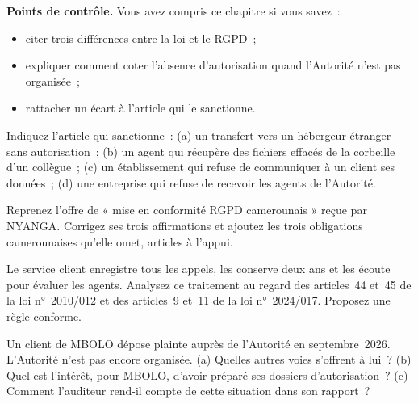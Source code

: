 \begin{boxinfo}
\textbf{Points de contrôle.} Vous avez compris ce chapitre si vous savez~:
\begin{itemize}
    \item citer trois différences entre la loi et le RGPD~;
    \item expliquer comment coter l'absence d'autorisation quand l'Autorité
          n'est pas organisée~;
    \item rattacher un écart à l'article qui le sanctionne.
\end{itemize}
\end{boxinfo}

\begin{boxexo}[title={\ding{45}\quad Exercice~8.1. Quel article \niveaubase}]
Indiquez l'article qui sanctionne~: (a) un transfert vers un hébergeur
étranger sans autorisation~; (b) un agent qui récupère des fichiers
effacés de la corbeille d'un collègue~; (c) un établissement qui refuse de
communiquer à un client ses données~; (d) une entreprise qui refuse de
recevoir les agents de l'Autorité.
\end{boxexo}

\begin{boxexo}[title={\ding{45}\quad Exercice~8.2. L'offre du cabinet \niveaumoyen}]
Reprenez l'offre de « mise en conformité RGPD camerounais » reçue par
NYANGA. Corrigez ses trois affirmations et ajoutez les trois obligations
camerounaises qu'elle omet, articles à l'appui.
\end{boxexo}

\begin{boxexo}[title={\ding{45}\quad Exercice~8.3. Les appels enregistrés \niveaumoyen}]
Le service client enregistre tous les appels, les conserve deux ans et les
écoute pour évaluer les agents. Analysez ce traitement au regard des
articles~44 et~45 de la loi n°~2010/012 et des articles~9 et~11 de la loi
n°~2024/017. Proposez une règle conforme.
\end{boxexo}

\begin{boxexo}[title={\ding{45}\quad Exercice~8.4. Sans Autorité \niveauexpert}]
Un client de MBOLO dépose plainte auprès de l'Autorité en septembre~2026.
L'Autorité n'est pas encore organisée. (a) Quelles autres voies s'offrent
à lui~? (b) Quel est l'intérêt, pour MBOLO, d'avoir préparé ses dossiers
d'autorisation~? (c) Comment l'auditeur rend-il compte de cette
situation dans son rapport~?
\end{boxexo}

